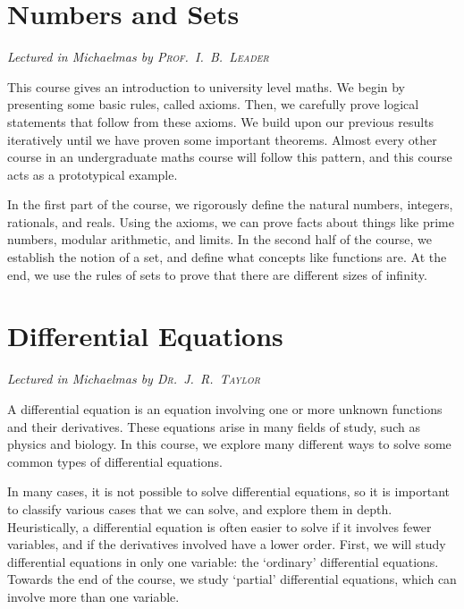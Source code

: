 \newcommand{\yearnumber}{IA}


\chapter[Numbers and Sets \\ \textnormal{\emph{Lectured in Michaelmas \oldstylenums{2020} by \textsc{Prof.\ I.\ B.\ Leader}}}]{Numbers and Sets}
\emph{\Large Lectured in Michaelmas  by \textsc{Prof.\ I.\ B.\ Leader}}

This course gives an introduction to university level maths.
We begin by presenting some basic rules, called axioms.
Then, we carefully prove logical statements that follow from these axioms.
We build upon our previous results iteratively until we have proven some important theorems.
Almost every other course in an undergraduate maths course will follow this pattern, and this course acts as a prototypical example.

In the first part of the course, we rigorously define the natural numbers, integers, rationals, and reals.
Using the axioms, we can prove facts about things like prime numbers, modular arithmetic, and limits.
In the second half of the course, we establish the notion of a set, and define what concepts like functions are.
At the end, we use the rules of sets to prove that there are different sizes of infinity.



\chapter[Differential Equations \\ \textnormal{\emph{Lectured in Michaelmas \oldstylenums{2020} by \textsc{Dr.\ J.\ R.\ Taylor}}}]{Differential Equations}
\emph{\Large Lectured in Michaelmas  by \textsc{Dr.\ J.\ R.\ Taylor}}

A differential equation is an equation involving one or more unknown functions and their derivatives.
These equations arise in many fields of study, such as physics and biology.
In this course, we explore many different ways to solve some common types of differential equations.

In many cases, it is not possible to solve differential equations, so it is important to classify various cases that we can solve, and explore them in depth.
Heuristically, a differential equation is often easier to solve if it involves fewer variables, and if the derivatives involved have a lower order.
First, we will study differential equations in only one variable: the `ordinary' differential equations.
Towards the end of the course, we study `partial' differential equations, which can involve more than one variable.

